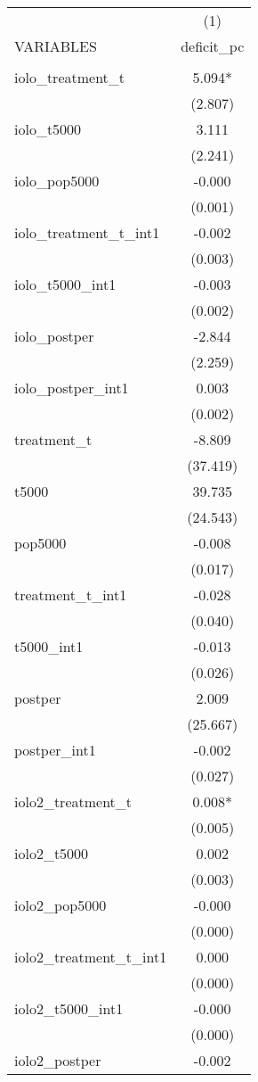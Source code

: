 \documentclass[]{article}
\begin{document}
\begin{tabular}{lc} \hline
 & (1) \\
VARIABLES & deficit\_pc \\ \hline
 &  \\
iolo\_treatment\_t & 5.094* \\
 & (2.807) \\
iolo\_t5000 & 3.111 \\
 & (2.241) \\
iolo\_pop5000 & -0.000 \\
 & (0.001) \\
iolo\_treatment\_t\_int1 & -0.002 \\
 & (0.003) \\
iolo\_t5000\_int1 & -0.003 \\
 & (0.002) \\
iolo\_postper & -2.844 \\
 & (2.259) \\
iolo\_postper\_int1 & 0.003 \\
 & (0.002) \\
treatment\_t & -8.809 \\
 & (37.419) \\
t5000 & 39.735 \\
 & (24.543) \\
pop5000 & -0.008 \\
 & (0.017) \\
treatment\_t\_int1 & -0.028 \\
 & (0.040) \\
t5000\_int1 & -0.013 \\
 & (0.026) \\
postper & 2.009 \\
 & (25.667) \\
postper\_int1 & -0.002 \\
 & (0.027) \\
iolo2\_treatment\_t & 0.008* \\
 & (0.005) \\
iolo2\_t5000 & 0.002 \\
 & (0.003) \\
iolo2\_pop5000 & -0.000 \\
 & (0.000) \\
iolo2\_treatment\_t\_int1 & 0.000 \\
 & (0.000) \\
iolo2\_t5000\_int1 & -0.000 \\
 & (0.000) \\
iolo2\_postper & -0.002 \\

\end{tabular}
\end{document}

